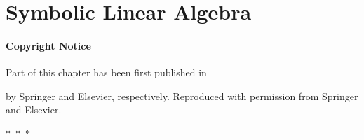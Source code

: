 
\chapter{Symbolic Linear Algebra}
\label{chap2:chap:symbolic_linear_algebra}

\subsubsection*{Copyright Notice}
Part of this chapter has been first published in
%
\begin{center}
  \begin{minipage}{0.9\textwidth}
  \end{minipage}
\end{center}
\begin{center}
  \begin{minipage}{0.9\textwidth}
  \end{minipage}
\end{center}
%
by Springer and Elsevier, respectively. Reproduced with permission from Springer and Elsevier.

\begin{center}
  $\ast$~$\ast$~$\ast$
\end{center}

%
%

